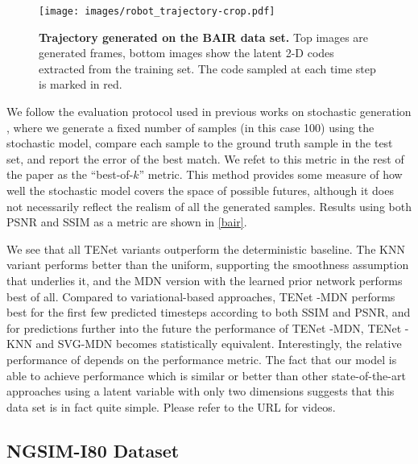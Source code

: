 \documentclass{article}
\newcommand{\modelname}{TENet }
\begin{document}
\begin{figure}
  \centering
  \centering
  \texttt{[image: images/robot\_trajectory-crop.pdf]}
  \caption{
    \textbf{Trajectory generated on the BAIR data set.}
    Top images are generated frames, bottom images show the latent 2-D codes extracted from the training set.
    The code sampled at each time step is marked in red.
  }
  \label{robot-trajectory}
\end{figure}

We follow the evaluation protocol used in previous works on stochastic generation \citep{Walker2016, Babaeizadeh2018, Denton2018}, where we generate a fixed number of samples (in this case 100) using the stochastic model, compare each sample to the ground truth sample in the test set, and report the error of the best match.
We refet to this metric in the rest of the paper as the ``best-of-$k$'' metric.
This method provides some measure of how well the stochastic model covers the space of possible futures, although it does not necessarily reflect the realism of all the generated samples.
Results using both PSNR and SSIM \citep{SSIM} as a metric are shown in \cref{bair}.

We see that all \modelname variants outperform the deterministic baseline.
The KNN variant performs better than the uniform, supporting the smoothness assumption that underlies it, and the MDN version with the learned prior network performs best of all.
Compared to variational-based approaches, \modelname-MDN performs best for the first few predicted timesteps according to both SSIM and PSNR, and for predictions further into the future the performance of \modelname-MDN, \modelname-KNN and SVG-MDN becomes statistically equivalent.
Interestingly, the relative performance of \citep{Babaeizadeh2018} depends on the performance metric.
The fact that our model is able to achieve performance which is similar or better than other state-of-the-art approaches using a latent variable with only two dimensions suggests that this data set is in fact quite simple.
Please refer to the URL for videos.

\subsection{NGSIM-I80 Dataset}
\end{document}
